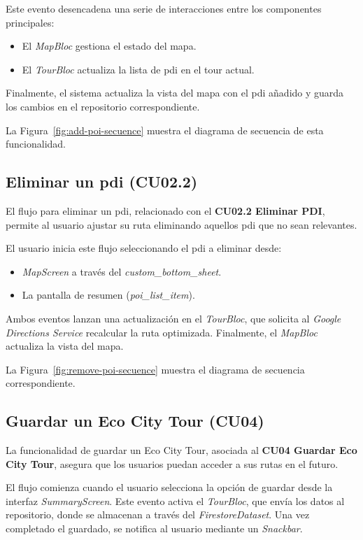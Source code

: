 Este evento desencadena una serie de interacciones entre los componentes principales:
\begin{itemize}
	\item El \textit{MapBloc} gestiona el estado del mapa.
	\item El \textit{TourBloc} actualiza la lista de \acrshort{pdi} en el tour actual.
\end{itemize}
Finalmente, el sistema actualiza la vista del mapa con el \acrshort{pdi} añadido y guarda los cambios en el repositorio correspondiente.

La Figura~\ref{fig:add-poi-secuence} muestra el diagrama de secuencia de esta funcionalidad.


\subsection{Eliminar un \acrshort{pdi} (CU02.2)}
El flujo para eliminar un \acrshort{pdi}, relacionado con el \textbf{CU02.2 Eliminar PDI}, permite al usuario ajustar su ruta eliminando aquellos \acrshort{pdi} que no sean relevantes.

El usuario inicia este flujo seleccionando el \acrshort{pdi} a eliminar desde:
\begin{itemize}
	\item \textit{MapScreen} a través del \textit{custom\_bottom\_sheet}.
	\item La pantalla de resumen (\textit{poi\_list\_item}).
\end{itemize}
Ambos eventos lanzan una actualización en el \textit{TourBloc}, que solicita al \textit{Google Directions Service} recalcular la ruta optimizada. Finalmente, el \textit{MapBloc} actualiza la vista del mapa.

La Figura~\ref{fig:remove-poi-secuence} muestra el diagrama de secuencia correspondiente.


\subsection{Guardar un Eco City Tour (CU04)}
La funcionalidad de guardar un Eco City Tour, asociada al \textbf{CU04 Guardar Eco City Tour}, asegura que los usuarios puedan acceder a sus rutas en el futuro.

El flujo comienza cuando el usuario selecciona la opción de guardar desde la interfaz \textit{SummaryScreen}. Este evento activa el \textit{TourBloc}, que envía los datos al repositorio, donde se almacenan a través del \textit{FirestoreDataset}. Una vez completado el guardado, se notifica al usuario mediante un \textit{Snackbar}.

